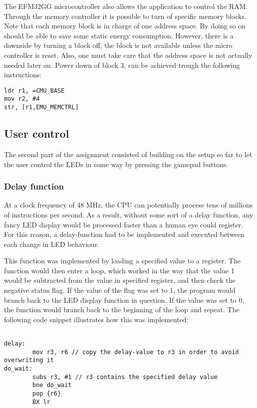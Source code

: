 The EFM32GG microcontroller also allows the application to control the RAM. Through the memory controller it is possible to turn of specific memory blocks. Note that each memory block is in charge of one address space. By doing so on should be able to save some static energy consumption. However, there is a downside by turning a block off, the block is not available unless the micro controller is reset.\cite{EFM32GG-energy} Also, one must take care that the address space is not actually needed later on. Power down of block 3, can be achieved trough the following instructions:

\begin{lstlisting}
ldr r1, =CMU_BASE
mov r2, #4
str, [r1,EMU_MEMCTRL]
\end{lstlisting}



  
\subsection{User control}\label{ch:user_control}

The second part of the assignment consisted of building on the setup so far to let the user control the LEDs in some way by pressing the gamepad buttons.

\subsubsection{Delay function}

At a clock frequency of 48 MHz, the CPU can potentially process tens of millions of instructions per second. As a result, without some sort of a delay function, any fancy LED display would be processed faster than a human eye could register. For this reason, a delay-function had to be implemented and executed between each change in LED behaviour.

This function was implemented by loading a specified value to a register. The function would then enter a loop, which worked in the way that the value 1 would be subtracted from the value in specified register, and then check the negative status flag. If the value of the flag was set to 1, the program would branch back to the LED display function in question. If the value was set to 0, the function would branch back to the beginning of the loop and repeat. The following code snippet illustrates how this was implemented:

\begin{lstlisting}

delay:
        mov r3, r6 // copy the delay-value to r3 in order to avoid overwriting it
do_wait:
        subs r3, #1 // r3 contains the specified delay value
        bne do_wait
        pop {r6}
        BX lr
        
\end{lstlisting}


